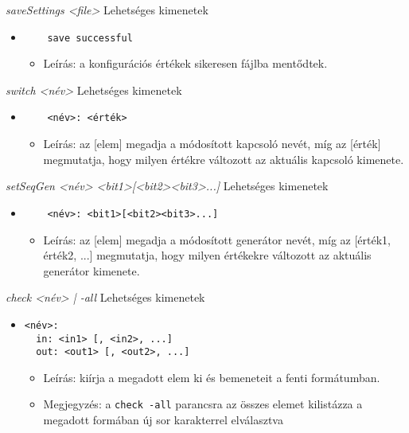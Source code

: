 \textit{saveSettings <file>}\newline
Lehetséges kimenetek
\begin{itemize}
	\item
	\begin{verbatim}
	save successful
	\end{verbatim}
	\begin{itemize}
		\item Leírás: a konfigurációs értékek sikeresen fájlba mentődtek.
	\end{itemize}
\end{itemize}

\textit{switch <név>}\newline
Lehetséges kimenetek
\begin{itemize}
	\item
	\begin{verbatim}
	<név>: <érték>
	\end{verbatim}
	\begin{itemize}
		\item Leírás: az [elem] megadja a módosított kapcsoló nevét, míg az [érték] megmutatja, hogy milyen értékre változott az aktuális kapcsoló kimenete. 
	\end{itemize}
\end{itemize}

\textit{setSeqGen <név> <bit1>[<bit2><bit3>...]}\newline
Lehetséges kimenetek
\begin{itemize}
	\item 
	\begin{verbatim}
	<név>: <bit1>[<bit2><bit3>...]
	\end{verbatim}
	\begin{itemize}
		\item Leírás: az [elem] megadja a módosított generátor nevét, míg az [érték1, érték2, ...] megmutatja, hogy milyen értékekre változott az aktuális generátor kimenete. 
	\end{itemize}
\end{itemize}

\textit{check <név> | -all}\newline
Lehetséges kimenetek
\begin{itemize}
	\item
	\begin{verbatim}
<név>:
  in: <in1> [, <in2>, ...]
  out: <out1> [, <out2>, ...]
	\end{verbatim}
	\begin{itemize}
		\item Leírás: kiírja a megadott elem ki és bemeneteit a fenti formátumban.
		\item Megjegyzés: a \texttt{check -all} parancsra az összes elemet kilistázza a megadott formában új sor karakterrel elválasztva
	\end{itemize}
\end{itemize}

